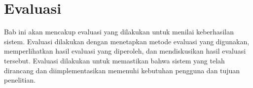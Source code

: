 \chapter{Evaluasi}
\label{chapter:evaluasi}
Bab ini akan mencakup evaluasi yang dilakukan untuk menilai keberhasilan sistem. Evaluasi dilakukan dengan menetapkan metode evaluasi yang digunakan, memperlihatkan hasil evaluasi yang diperoleh, dan mendiskusikan hasil evaluasi tersebut. Evaluasi dilakukan untuk memastikan bahwa sistem yang telah dirancang dan diimplementasikan memenuhi kebutuhan pengguna dan tujuan penelitian.





